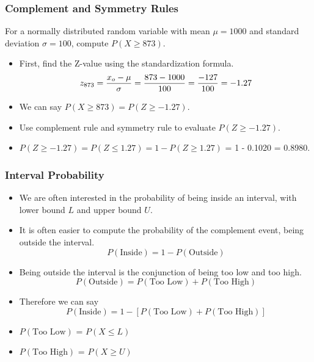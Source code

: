 \documentclass[a4]{beamer}
\begin{document}
\begin{frame}
\frametitle{Complement and Symmetry Rules}

For a normally distributed random variable with mean $\mu = 1000$ and standard deviation $\sigma = 100$, compute $P(X \geq 873)$.

\begin{itemize} \item First, find the Z-value using the standardization formula.
\[
z_{873} = {x_o - \mu \over \sigma} = {873 - 1000 \over 100} = {-127 \over 100} = -1.27
\]
\item We can say $P(X \geq 873) = P(Z \geq -1.27)$.
\item Use complement rule and symmetry rule to evaluate  $P(Z \geq -1.27)$.
\item $ P(Z \geq -1.27) = P(Z \leq 1.27) = 1 - P(Z \geq 1.27) $  = 1 - 0.1020 = \alert{0.8980}.
\end{itemize}
\end{frame}


\begin{frame}
\frametitle{Interval Probability}
\begin{itemize}
\item We are often interested in the probability of being inside an interval, with lower bound $L$ and upper bound $U$.
\item It is often easier to compute the probability of the complement event, being outside the interval.
\[ P( \mbox{Inside} ) = 1 - P( \mbox{Outside} )  \]

\item Being outside the interval is the conjunction of being too low and too high.
\[ P( \mbox{Outside} ) = P( \mbox{Too Low} ) +  P( \mbox{Too High} ) \]

\item Therefore we can say
\[ P( \mbox{Inside} ) = 1- [P( \mbox{Too Low} ) +  P( \mbox{Too High} )] \]
\item $P( \mbox{Too Low} )$ = $P( X \leq L)$
\item $P( \mbox{Too High} )$ = $P( X \geq U)$
\end{itemize}
\end{frame}
\end{document}
